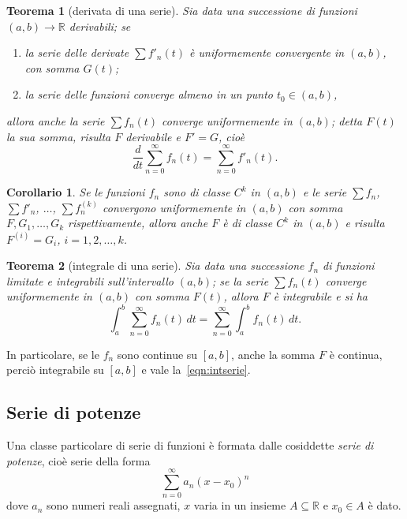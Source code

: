 \documentclass[a4paper]{book}
\numberwithin{equation}{section}
\theoremstyle{plain}
\newtheorem{teor}{Teorema}[section]
\newtheorem{cor}{Corollario}[section]
\theoremstyle{definition}
\theoremstyle{remark}
\theoremstyle{example}
\begin{document}
		\begin{teor}[derivata di una serie]
		Sia data una successione di funzioni $(a, b) \to \mathbb{R}$ derivabili; se
			\begin{enumerate}
				\item la serie delle derivate $\sum f'_n(t)$ è uniformemente convergente in $(a, b)$, con somma $G(t)$;
				\item la serie delle funzioni converge almeno in un punto $t_0 \in (a, b)$,
			\end{enumerate}
		allora anche la serie $\sum f_n(t)$ converge uniformemente in $(a, b)$; detta $F(t)$ la sua somma, risulta $F$ derivabile e $F' = G$, cioè
			\begin{equation}
				\frac{d}{dt} \sum_{n=0}^{\infty} f_n(t) = \sum_{n=0}^{\infty} f'_n(t).
			\end{equation}
		\end{teor}

		\begin{cor}
			Se le funzioni $f_n$ sono di classe $C^k$ in $(a, b)$ e le serie $\sum f_n$, $\sum f'_n$, $\dots$, $\sum f^{(k)}_n$ convergono uniformemente in $(a, b)$ con somma $F, G_1, \dots, G_k$ rispettivamente, allora anche $F$ è di classe $C^k$ in $(a, b)$ e risulta $F^{(i)} = G_i$, $i = 1, 2, \dots, k$.
		\end{cor}

		\begin{teor}[integrale di una serie]
			Sia data una successione $f_n$ di funzioni limitate e integrabili sull'intervallo $(a, b)$; se la serie $\sum f_n(t)$ converge uniformemente in $(a, b)$ con somma $F(t)$, allora $F$ è integrabile e si ha
				\begin{equation}
					\label{eqn:intserie}
					\int_a^b \sum_{n=0}^{\infty}f_n(t)\,dt = \sum_{n=0}^{\infty} \int_a^b f_n(t)\,dt.
				\end{equation}
		\end{teor}
		In particolare, se le $f_n$ sono continue su $[a, b]$, anche la somma $F$ è continua, perciò integrabile su $[a, b]$ e vale la~\eqref{eqn:intserie}.

		\subsection{Serie di potenze}
		Una classe particolare di serie di funzioni è formata dalle cosiddette \emph{serie di potenze}, cioè serie della forma
			\begin{equation*}
				\sum_{n=0}^{\infty} a_n(x - x_0)^n
			\end{equation*}
		dove $a_n$ sono numeri reali assegnati, $x$ varia in un insieme $A \subseteq \mathbb{R}$ e $x_0 \in A$ è dato.
\end{document}
